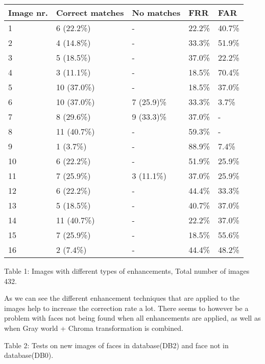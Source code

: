 \begin{center}
    \begin{tabular}{ | l | l | l | l | p{15mm} |}
    \hline
    \textbf{Image nr.} & \textbf{Correct matches} & \textbf{No matches} & \textbf{FRR} & \textbf{FAR} \\ \hline
    1 & 6 (22.2\%) & - & 22.2\% & 40.7\%\\
    \hline
    2 & 4 (14.8\%) & - & 33.3\% & 51.9\% \\
    \hline
    3 & 5 (18.5\%) & - & 37.0\% & 22.2\% \\
    \hline
    4 & 3 (11.1\%) & - & 18.5\% & 70.4\% \\
    \hline
    5 & 10 (37.0\%) & - & 18.5\% & 37.0\% \\
    \hline
    6 & 10 (37.0\%) & 7 (25.9)\% & 33.3\% & 3.7\% \\
    \hline
    7 & 8 (29.6\%) & 9 (33.3)\% & 37.0\% & - \\
    \hline
    8 & 11 (40.7\%) & - & 59.3\% & - \\
    \hline
    9 & 1 (3.7\%) & - & 88.9\% & 7.4\% \\
    \hline
    10 & 6 (22.2\%) & - & 51.9\% & 25.9\% \\
    \hline
    11 & 7 (25.9\%) & 3 (11.1\%) & 37.0\% & 25.9\% \\
    \hline
    12 & 6 (22.2\%) & - & 44.4\% & 33.3\% \\
    \hline
    13 & 5 (18.5\%) & - & 40.7\% & 37.0\% \\
    \hline
    14 & 11 (40.7\%) & - & 22.2\% & 37.0\% \\
    \hline
    15 & 7 (25.9\%) & - & 18.5\% & 55.6\% \\
    \hline
    16 & 2 (7.4\%) & - & 44.4\% & 48.2\% \\
    \hline


    \end{tabular}
\end{center}

Table 1: Images with different types of enhancements, Total number of images 432.

As we can see the different enhancement techniques that are applied to the images help to increase the correction rate a lot. There seems to however be a problem with faces not being found when all enhancements are applied, as well as when Gray world + Chroma transformation is combined.

Table 2: Tests on new images of faces in database(DB2) and face not in database(DB0).
